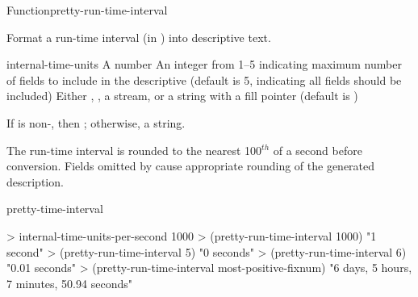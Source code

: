 \documentclass[10pt,twoside,english,pdftex]{article}
\begin{document}

\begin{functiondoc}{Function}{pretty-run-time-interval}{%
      
    \returns{} }
% 
% 

\fnsyntax

\fnpurpose Format a run-time interval (in ) into
descriptive text.

\fnpackage {}

\fnmodule {}

\fnargs
\begin{args}{internal-time-units}
 A number
 An integer from 1--5 indicating maximum number of fields 
to include in the descriptive  (default is 5, indicating all 
fields should be included)
\arg[destination] Either \nil, , a stream, or a string with a fill 
pointer (default is \nil)
\end{args}

\fnreturns If  is non-\nil, then \nil; otherwise, a string.

\fndescription The  run-time interval is rounded to
the nearest 100$^{th}$ of a second before conversion. Fields omitted by
 cause appropriate rounding of the generated description.

\begin{alsos}{pretty-time-interval}
\end{alsos}

\fnexamples
%
\W\supp
\begin{example}
> internal-time-units-per-second
1000
> (pretty-run-time-interval 1000)
"1 second"
> (pretty-run-time-interval 5)
"0 seconds"
> (pretty-run-time-interval 6)
"0.01 seconds"
> (pretty-run-time-interval most-positive-fixnum)
"6 days, 5 hours, 7 minutes, 50.94 seconds"
\end{example}

\end{functiondoc}

\end{document}
